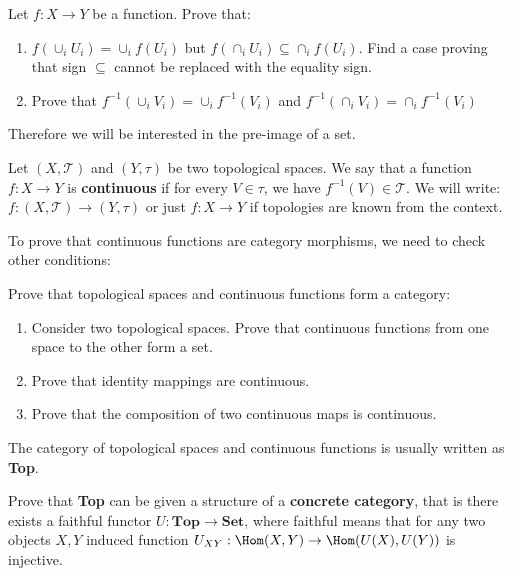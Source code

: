 \begin{exercise}
  Let $f: X\to Y$ be a function. Prove that:
  \begin{enumerate}
    \item $f\left(\cup_i U_i\right)=\cup_i f(U_i)$ but $f(\cap_i U_i)\subseteq \cap_i f(U_i)$. Find a case proving that sign $\subseteq$ cannot be replaced with the equality sign.
    \item Prove that $f^{-1}(\cup_iV_i)=\cup_i f^{-1}(V_i)$ and $f^{-1}(\cap_iV_i)=\cap_if^{-1}(V_i)$
  \end{enumerate}
\end{exercise}

Therefore we will be interested in the pre-image of a set.

\begin{definition}
  Let $(X,\mathcal T)$ and $(Y, \tau)$ be two topological spaces. We say that a function $f:X\to Y$ is \textbf{continuous} if for every $V\in \tau$, we have $f^{-1}(V)\in \mathcal T$. We will write:
  $f:(X,\mathcal T)\to(Y, \tau)$ or just $f:X\to Y$ if topologies are known from the context.
\end{definition}

To prove that continuous functions are category morphisms, we need to check other conditions:

\begin{exercise}
  Prove that topological spaces and continuous functions form a category:
  \begin{enumerate}
    \item Consider two topological spaces. Prove that continuous functions from one space to the other form a set.
    \item Prove that identity mappings are continuous.
    \item Prove that the composition of two continuous maps is continuous.
  \end{enumerate}
\end{exercise}

\begin{definition}
  The category of topological spaces and continuous functions is usually written as \textbf{Top}.
\end{definition}

\begin{exercise}
  Prove that \textbf{Top} can be given a structure of a \textbf{concrete category}, that is there exists a faithful functor $U: \textbf{Top}\to \textbf{Set}$, where faithful means that for any two objects $X,Y$
  induced function $U_{XY}: \Hom(X,Y)\to \Hom(U(X), U(Y))$ is injective.
\end{exercise}


